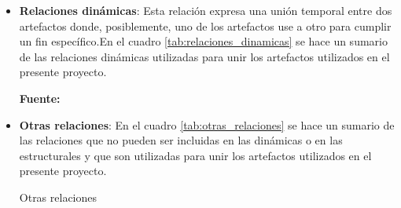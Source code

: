 \begin{itemize}
\item \textbf{Relaciones dinámicas}: Esta relación expresa una unión temporal entre dos artefactos donde, posiblemente, uno de los artefactos use a otro para cumplir un fin específico.En el cuadro \ref{tab:relaciones_dinamicas} se hace un sumario de las relaciones dinámicas utilizadas para unir los artefactos utilizados en el presente proyecto.

\begin{table}
  \caption{Relaciones dinámicas}
  \label{tab:relaciones_dinamicas}

  \begin{center}
  
  \textbf{Fuente:} \cite{archimate2}
    \end{center}
\end{table}

\item \textbf{Otras relaciones}: En el cuadro \ref{tab:otras_relaciones} se hace un sumario de las relaciones que no pueden ser incluidas en las dinámicas o en las estructurales y que son utilizadas para unir los artefactos utilizados en el presente proyecto.

\begin{table}
  \caption{Otras relaciones}
  \label{tab:otras_relaciones}

  \begin{center}
  

\end{center}
\end{table}
\end{itemize}
